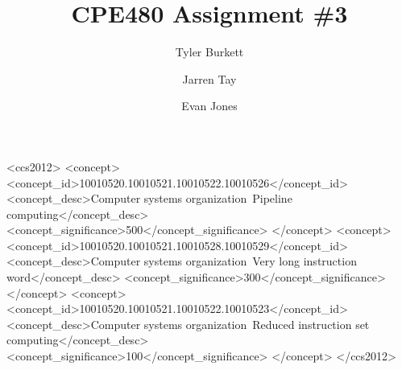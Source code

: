 \documentclass[sigconf]{acmart}
\begin{document}
%
\title{CPE480 Assignment \#3 }

%
\author{Tyler Burkett}

\author{Jarren Tay}

\author{Evan Jones}
%
\renewcommand{\shortauthors}{Burkett, Jones, Tay}

%
\begin{abstract}
\end{abstract}

%
%
  \begin{CCSXML}
<ccs2012>
<concept>
<concept_id>10010520.10010521.10010522.10010526</concept_id>
<concept_desc>Computer systems organization~Pipeline computing</concept_desc>
<concept_significance>500</concept_significance>
</concept>
<concept>
<concept_id>10010520.10010521.10010528.10010529</concept_id>
<concept_desc>Computer systems organization~Very long instruction word</concept_desc>
<concept_significance>300</concept_significance>
</concept>
<concept>
<concept_id>10010520.10010521.10010522.10010523</concept_id>
<concept_desc>Computer systems organization~Reduced instruction set computing</concept_desc>
<concept_significance>100</concept_significance>
</concept>
</ccs2012>
\end{CCSXML}
\end{document}
